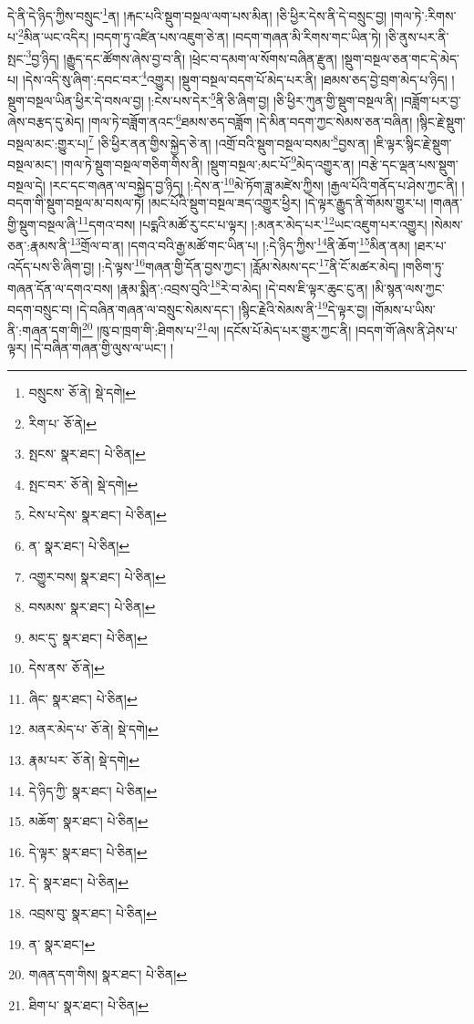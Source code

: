 དེ་ནི་དེ་ཉིད་ཀྱིས་བསྲུང་\footnote{བསྲུངས་  ཅོ་ནེ།  སྡེ་དགེ། }ན། །རྐང་པའི་སྡུག་བསྔལ་ལག་པས་མིན། །ཅི་ཕྱིར་དེས་ནི་དེ་བསྲུང་བྱ། །གལ་ཏེ་:རིགས་པ་\footnote{རིག་པ་  ཅོ་ནེ། }མིན་ཡང་འདིར། །བདག་ཏུ་འཛིན་པས་འཇུག་ཅེ་ན། །བདག་གཞན་མི་རིགས་གང་ཡིན་ཏེ། །ཅི་ནུས་པར་ནི་སྤང་\footnote{སྤངས་  སྣར་ཐང་།  པེ་ཅིན། }བྱ་ཉིད། །རྒྱུད་དང་ཚོགས་ཞེས་བྱ་བ་ནི། །ཕྲེང་བ་དམག་ལ་སོགས་བཞིན་རྫུན། །སྡུག་བསྔལ་ཅན་གང་དེ་མེད་པ། །དེས་འདི་སུ་ཞིག་:དབང་བར་\footnote{སྤང་བར་  ཅོ་ནེ།  སྡེ་དགེ། }འགྱུར། །སྡུག་བསྔལ་བདག་པོ་མེད་པར་ནི། །ཐམས་ཅད་བྱེ་བྲག་མེད་པ་ཉིད། །སྡུག་བསྔལ་ཡིན་ཕྱིར་དེ་བསལ་བྱ། །:ངེས་པས་དེར་\footnote{ངེས་པ་དེས་  སྣར་ཐང་།  པེ་ཅིན། }ནི་ཅི་ཞིག་བྱ། །ཅི་ཕྱིར་ཀུན་གྱི་སྡུག་བསྔལ་ནི། །བཟློག་པར་བྱ་ཞེས་བརྩད་དུ་མེད། །གལ་ཏེ་བཟློག་ནའང་\footnote{ན་  སྣར་ཐང་།  པེ་ཅིན། }ཐམས་ཅད་བཟློག །དེ་མིན་བདག་ཀྱང་སེམས་ཅན་བཞིན། །སྙིང་རྗེ་སྡུག་བསྔལ་མང་:གྱུར་པ།\footnote{འགྱུར་བས།  སྣར་ཐང་།  པེ་ཅིན། } །ཅི་ཕྱིར་ནན་གྱིས་སྐྱེད་ཅེ་ན། །འགྲོ་བའི་སྡུག་བསྔལ་བསམ་\footnote{བསམས་  སྣར་ཐང་།  པེ་ཅིན། }བྱས་ན། །ཇི་ལྟར་སྙིང་རྗེ་སྡུག་བསྔལ་མང་། །གལ་ཏེ་སྡུག་བསྔལ་གཅིག་གིས་ནི། །སྡུག་བསྔལ་:མང་པོ་\footnote{མང་དུ་  སྣར་ཐང་།  པེ་ཅིན། }མེད་འགྱུར་ན། །བརྩེ་དང་ལྡན་པས་སྡུག་བསྔལ་དེ། །རང་དང་གཞན་ལ་བསྐྱེད་བྱ་ཉིད། །:དེས་ན་\footnote{དེས་ནས་  ཅོ་ནེ། }མེ་ཏོག་ཟླ་མཛེས་ཀྱིས། །རྒྱལ་པོའི་གནོད་པ་ཤེས་ཀྱང་ནི། །བདག་གི་སྡུག་བསྔལ་མ་བསལ་ཏེ། །མང་པོའི་སྡུག་བསྔལ་ཟད་འགྱུར་ཕྱིར། །དེ་ལྟར་རྒྱུད་ནི་གོམས་གྱུར་པ། །གཞན་གྱི་སྡུག་བསྔལ་ཞི་\footnote{ཞིང་  སྣར་ཐང་།  པེ་ཅིན། }དགའ་བས། །པདྨའི་མཚོ་རུ་ངང་པ་ལྟར། །:མནར་མེད་པར་\footnote{མནར་མེད་པ་  ཅོ་ནེ།  སྡེ་དགེ། }ཡང་འཇུག་པར་འགྱུར། །སེམས་ཅན་:རྣམས་ནི་\footnote{རྣམ་པར་  ཅོ་ནེ།  སྡེ་དགེ། }གྲོལ་བ་ན། །དགའ་བའི་རྒྱ་མཚོ་གང་ཡིན་པ། །:དེ་ཉིད་ཀྱིས་\footnote{དེ་ཉིད་ཀྱི་  སྣར་ཐང་།  པེ་ཅིན། }ནི་ཆོག་\footnote{མཆོག་  སྣར་ཐང་།  པེ་ཅིན། }མིན་ནམ། །ཐར་པ་འདོད་པས་ཅི་ཞིག་བྱ། །:དེ་ལྟས་\footnote{དེ་ལྟར་  སྣར་ཐང་།  པེ་ཅིན། }གཞན་གྱི་དོན་བྱས་ཀྱང་། །རློམ་སེམས་དང་\footnote{དེ་  སྣར་ཐང་།  པེ་ཅིན། }ནི་ངོ་མཚར་མེད། །གཅིག་ཏུ་གཞན་དོན་ལ་དགའ་བས། །རྣམ་སྨིན་:འབྲས་བུའི་\footnote{འབྲས་བུ་  སྣར་ཐང་།  པེ་ཅིན། }རེ་བ་མེད། །དེ་བས་ཇི་ལྟར་ཆུང་ངུ་ན། །མི་སྙན་ལས་ཀྱང་བདག་བསྲུང་བ། །དེ་བཞིན་གཞན་ལ་བསྲུང་སེམས་དང་། །སྙིང་རྗེའི་སེམས་ནི་\footnote{ན་  སྣར་ཐང་། }དེ་ལྟར་བྱ། །གོམས་པ་ཡིས་ནི་:གཞན་དག་གི།\footnote{གཞན་དག་གིས།  སྣར་ཐང་།  པེ་ཅིན། } །ཁུ་བ་ཁྲག་གི་:ཐིགས་པ་\footnote{ཐིག་པ་  སྣར་ཐང་།  པེ་ཅིན། }ལ། །དངོས་པོ་མེད་པར་གྱུར་ཀྱང་ནི། །བདག་གོ་ཞེས་ནི་ཤེས་པ་ལྟར། །དེ་བཞིན་གཞན་གྱི་ལུས་ལ་ཡང་། །
